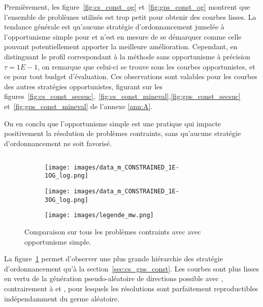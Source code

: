Premièrement, les figure~\ref{fig:cs_const_og} et~\ref{fig:gps_const_og} montrent que l'ensemble de problèmes utilisés est trop petit pour obtenir des courbes lisses. La tendance générale est qu'aucune stratégie d'ordonnancement jumelée à l'opportunisme simple pour \CS et \GPS n'est en mesure de se démarquer comme celle pouvant potentiellement apporter la meilleure amélioration. Cependant, en distinguant le profil correspondant à la méthode sans opportunisme à précision $\tau = 1E-1$, on remarque que celui-ci se trouve sous les courbes opportunistes, et ce pour tout budget d'évaluation. Ces observations sont valables pour les courbes des autres stratégies opportunistes, figurant sur les  figures~\ref{fig:cs_const_secsuc},~\ref{fig:cs_const_mineval},\ref{fig:gps_const_secsuc} et~\ref{fig:gps_const_mineval}  de l'annexe \ref{ann:A}.

On en conclu que l'opportunisme simple est une pratique qui impacte positivement la résolution de problèmes contraints, sans qu'aucune stratégie d'ordonnancement ne soit favorisé.
\subsection{\MADS}
 \smallskip\hfill
\begin{figure}[!htb]
	\centering
	\begin{subfigure}{0.43\textwidth}
		\texttt{[image: images/data\_m\_CONSTRAINED\_1E-1OG\_log.png]}
	\end{subfigure}%
	\begin{subfigure}{0.43\textwidth}
		\texttt{[image: images/data\_m\_CONSTRAINED\_1E-3OG\_log.png]}
	\end{subfigure}
	\smallskip
	\begin{subfigure}{0.95\textwidth}
		\texttt{[image: images/legende\_mw.png]}
	\end{subfigure}
	\caption{Comparaison sur tous les problèmes contraints avec \MADS avec opportunisme simple.}
	\label{fig:mads_const_og}
\end{figure}
La figure~\ref{fig:mads_const_og} permet d'observer une plus grande hiérarchie des stratégie d'ordonnancement qu'à la section~\ref{sec:cs_gps_const}. Les courbes sont plus lisses en vertu de la génération pseudo-aléatoire de directions possible avec \MADS, contrairement à \CS et \GPS, pour lesquels les résolutions sont parfaitement reproductibles indépendamment du germe aléatoire.

